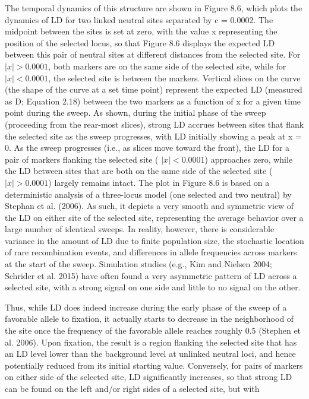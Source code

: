 \documentclass{article}
\begin{document}
The temporal dynamics of this structure are shown in Figure 8.6, which plots the dynamics of LD for two linked neutral sites separated by c = 0.0002. The midpoint between the sites is set at zero, with the value x representing the position of the selected locus, so that Figure 8.6 displays the expected LD between this pair of neutral sites at different distances from the selected site. For  $ |x| > 0.0001 $, both markers are on the same side of the selected site, while for  $ |x| < 0.0001 $, the selected site is between the markers. Vertical slices on the curve (the shape of the curve at a set time point) represent the expected LD (measured as D; Equation 2.18) between the two markers as a function of x for a given time point during the sweep. As shown, during the initial phase of the sweep (proceeding from the rear-most slices), strong LD accrues between sites that flank the selected site as the sweep progresses, with LD initially showing a peak at x = 0. As the sweep progresses (i.e., as slices move toward the front), the LD for a pair of markers flanking the selected site ( $ |x| < 0.0001 $) approaches zero, while the LD between sites that are both on the same side of the selected site ( $ |x| > 0.0001 $) largely remains intact. The plot in Figure 8.6 is based on a deterministic analysis of a three-locus model (one selected and two neutral) by Stephan et al. (2006). As such, it depicts a very smooth and symmetric view of the LD on either site of the selected site, representing the average behavior over a large number of identical sweeps. In reality, however, there is considerable variance in the amount of LD due to finite population size, the stochastic location of rare recombination events, and differences in allele frequencies across markers at the start of the sweep. Simulation studies (e.g., Kim and Nielsen 2004; Schrider et al. 2015) have often found a very asymmetric pattern of LD across a selected site, with a strong signal on one side and little to no signal on the other.

Thus, while LD does indeed increase during the early phase of the sweep of a favorable allele to fixation, it actually starts to decrease in the neighborhood of the site once the frequency of the favorable allele reaches roughly 0.5 (Stephen et al. 2006). Upon fixation, the result is a region flanking the selected site that has an LD level lower than the background level at unlinked neutral loci, and hence potentially reduced from its initial starting value. Conversely, for pairs of markers on either side of the selected site, LD significantly increases, so that strong LD can be found on the left and/or right sides of a selected site, but with
\end{document}
